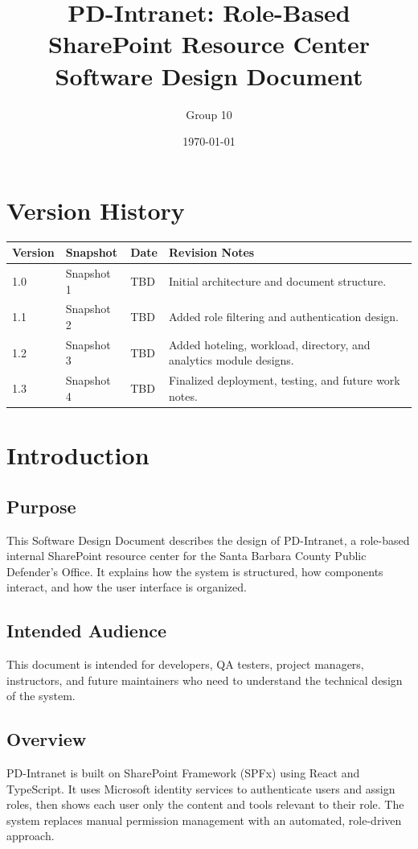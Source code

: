 \documentclass[12pt]{article}
\title{PD-Intranet: Role-Based SharePoint Resource Center \\ \large Software Design Document}
\author{Group 10}
\date{\today}
\begin{document}
\maketitle
\tableofcontents
\newpage

\section{Version History}
\begin{longtable}{|p{1in}|p{1.3in}|p{1.4in}|p{2.6in}|}
\hline
\textbf{Version} & \textbf{Snapshot} & \textbf{Date} & \textbf{Revision Notes} \\ \hline
1.0 & Snapshot 1 & TBD & Initial architecture and document structure. \\ \hline
1.1 & Snapshot 2 & TBD & Added role filtering and authentication design. \\ \hline
1.2 & Snapshot 3 & TBD & Added hoteling, workload, directory, and analytics module designs. \\ \hline
1.3 & Snapshot 4 & TBD & Finalized deployment, testing, and future work notes. \\ \hline
\end{longtable}

\section{Introduction}

\subsection{Purpose}
This Software Design Document describes the design of PD-Intranet, a role-based internal SharePoint resource center for the Santa Barbara County Public Defender's Office. It explains how the system is structured, how components interact, and how the user interface is organized.

\subsection{Intended Audience}
This document is intended for developers, QA testers, project managers, instructors, and future maintainers who need to understand the technical design of the system.

\subsection{Overview}
PD-Intranet is built on SharePoint Framework (SPFx) using React and TypeScript. It uses Microsoft identity services to authenticate users and assign roles, then shows each user only the content and tools relevant to their role. The system replaces manual permission management with an automated, role-driven approach.
\end{document}
